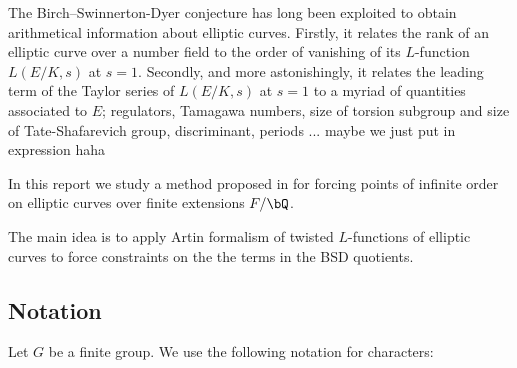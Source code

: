 The Birch--Swinnerton-Dyer conjecture has long been exploited to obtain arithmetical information about elliptic curves. Firstly, it relates the rank of an elliptic curve over a number field to the order of vanishing of its $L$-function $L(E / K, s)$ at $s = 1$. Secondly, and more astonishingly, it relates the leading term of the Taylor series of $L(E / K, s)$ at $s = 1$ to a myriad of quantities associated to $E$;  regulators, Tamagawa numbers, size of torsion subgroup and size of Tate-Shafarevich group, discriminant, periods ... {\color{red} maybe we just put in expression haha}



In this report we study a method proposed in \cite{DEW1} for forcing points of infinite order on elliptic curves over finite extensions $F / \bQ$. 

The main idea is to apply Artin formalism of twisted $L$-functions of elliptic curves to force constraints on the the terms in the BSD quotients.






\subsection*{Notation}
Let $G$ be a finite group. We use the following notation for characters:

\bigskip

